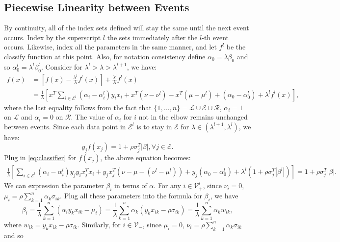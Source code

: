 \documentclass[10pt]{article}
\theoremstyle{definition}
\begin{document}
\subsection{Piecewise Linearity between Events}
By continuity, all of the index sets defined will stay the same until the next event occurs. Index by the superscript $l$ the sets immediately after the $l$-th event occurs. Likewise, index all the parameters in the same manner, and let $f^l$ be the classify function at this point. Also, for notation consistency define $\alpha_0 = \lambda \beta_0$ and so $\alpha_0^l = \lambda^l \beta_0^l$. Consider for $\lambda^l > \lambda > \lambda^{l+1}$, we have:
\begin{align}
\label{eq:classifier}
f(x) & = [f(x) - \frac{\lambda^l}{\lambda}f^l(x)] + \frac{\lambda^l}{\lambda}f^l(x) \nonumber \\
& = \frac{1}{\lambda}[x^T\sum_{i\in\mathcal E^l}(\alpha_i-\alpha_i^l)y_ix_i+x^T(\nu-\nu^l)-x^T(\mu-\mu^l)+(\alpha_0-\alpha_0^l) +\lambda^l f^l(x)],
\end{align}
where the last equality follows from the fact that $\{1,...,n\}=\mathcal L\cup\mathcal E\cup \mathcal R$, $\alpha_i = 1$ on $\mathcal L$ and $\alpha_i=0$ on $\mathcal R$. The value of $\alpha_i$ for $i$ not in the elbow remains unchanged between events. Since each data point in $\mathcal E^l$ is to stay in $\mathcal E$ for $\lambda\in (\lambda^{l+1},\lambda^{l})$, we have:
\[y_jf(x_j) = 1+ \rho\sigma_j^T|\beta|, \forall j\in\mathcal E.\]
Plug in \eqref{eq:classifier} for $f(x_j)$, the above equation becomes:
\begin{align}
\label{eq:elbow}
\frac{1}{\lambda}[\sum_{i\in\mathcal E^l}(\alpha_i-\alpha_i^l)y_jy_ix_j^Tx_i+y_jx_j^T(\nu-\mu-(\nu^l-\mu^l))+y_j(\alpha_0-\alpha_0^l) +\lambda^l (1+\rho \sigma_j^T|\beta^l|)] = 1+\rho\sigma_j^T|\beta|.
\end{align}
We can expression the parameter $\beta_i$ in terms of $\alpha$. For any $i\in\mathcal V_+^l$, since $\nu_i=0$, $\mu_i = \rho\sum_{k=1}^n \alpha_k\sigma_{ik}$. Plug all these parameters into the formula for $\beta_i$, we have
\[
\beta_i = \frac{1}{\lambda}\sum_{k=1}^n(\alpha_iy_kx_{ik}-\mu_i) =\frac{1}{\lambda}\sum_{k=1}^n\alpha_k(y_kx_{ik}-\rho\sigma_{ik}) = \frac{1}{\lambda}\sum_{k=1}^n\alpha_kw_{ik},\]
where $w_{ik} =y_kx_{ik}-\rho\sigma_{ik}$. Similarly, for $i\in\mathcal V_-$, since $\mu_i=0$, $\nu_i = \rho\sum_{k=1}^n \alpha_k\sigma_{ik}$ and so
\end{document}

